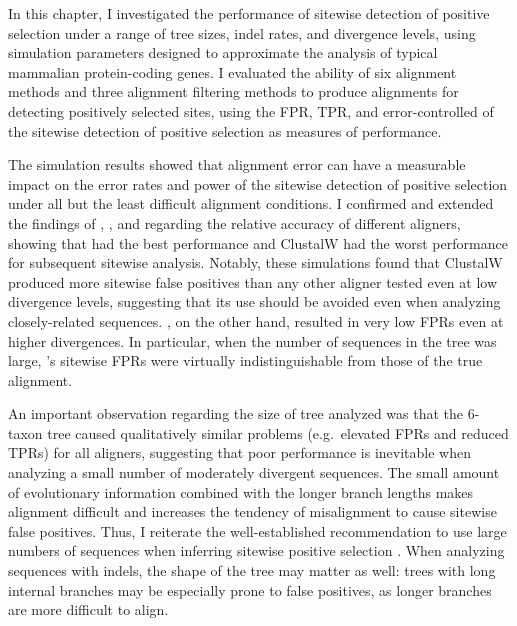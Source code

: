 In this chapter, I investigated the performance of sitewise detection
of positive selection under a range of tree sizes, indel rates, and
divergence levels, using simulation parameters designed to approximate
the analysis of typical mammalian protein-coding genes. I evaluated
the ability of six alignment methods and three alignment filtering
methods to produce alignments for detecting positively selected sites,
using the FPR, TPR, and error-controlled \tpr of the sitewise
detection of positive selection as measures of performance.

The simulation results showed that alignment error can have a
measurable impact on the error rates and power of the sitewise
detection of positive selection under all but the least difficult
alignment conditions. I confirmed and extended the findings of
\citet{Fletcher2010}, \citet{MarkovaRaina2011}, and
\citet{Privman2011Improving} regarding the relative accuracy of
different aligners, showing that \prankc had the best performance and
ClustalW had the worst performance for subsequent sitewise
analysis. Notably, these simulations found that ClustalW produced more
sitewise false positives than any other aligner tested even at low
divergence levels, suggesting that its use should be avoided even when
analyzing closely-related sequences. \prankc, on the other hand,
resulted in very low FPRs even at higher divergences. In particular,
when the number of sequences in the tree was large, \prankc{}'s
sitewise FPRs were virtually indistinguishable from those of the true
alignment.

An important observation regarding the size of tree analyzed was that
the 6-taxon tree caused qualitatively similar problems (e.g.\,
elevated FPRs and reduced TPRs) for all aligners, suggesting that poor
performance is inevitable when analyzing a small number of moderately
divergent sequences. The small amount of evolutionary information
combined with the longer branch lengths makes alignment difficult and
increases the tendency of misalignment to cause sitewise false
positives. Thus, I reiterate the well-established recommendation to
use large numbers of sequences when inferring sitewise positive
selection \citep{Anisimova2001,Anisimova2002}. When analyzing
sequences with indels, the shape of the tree may matter as well: trees
with long internal branches may be especially prone to false
positives, as longer branches are more difficult to align.

